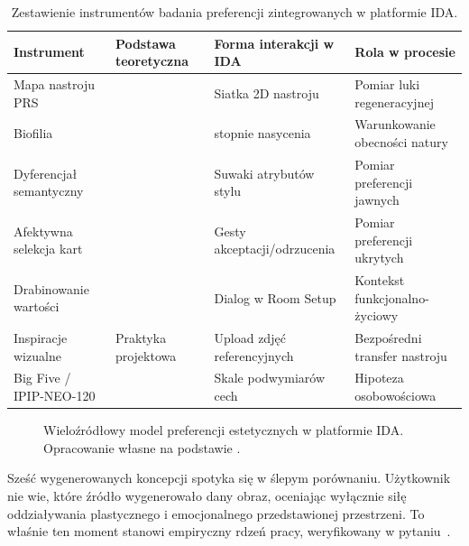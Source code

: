 \begin{table}[htbp]
  \centering
  \caption{Zestawienie instrumentów badania preferencji zintegrowanych w platformie IDA.}
  \label{tab:ch03:instruments}
  \begin{tabular}{@{}>{\raggedright\arraybackslash}p{}>{\raggedright\arraybackslash}p{}>{\raggedright\arraybackslash}p{}>{\raggedright\arraybackslash}p{}@{}}
    \toprule
    Instrument & Podstawa teoretyczna & Forma interakcji w IDA & Rola w procesie \\
    \midrule
    Mapa nastroju PRS
      & \textcite{hartig1997prs,kaplan1995restorative}
      & Siatka 2D nastroju
      & Pomiar luki regeneracyjnej \\
    Biofilia
      & \textcite{kellert2008biophilic}
      & 4 stopnie nasycenia
      & Warunkowanie obecności natury \\
    Dyferencjał semantyczny
      & \textcite{osgood1957measurement}
      & Suwaki atrybutów stylu
      & Pomiar preferencji jawnych \\
    Afektywna selekcja kart
      & \textcite{greenwald1998iat}
      & Gesty akceptacji/odrzucenia
      & Pomiar preferencji ukrytych \\
    Drabinowanie wartości
      & \textcite{reynolds1988laddering}
      & Dialog w Room Setup
      & Kontekst funkcjonalno-życiowy \\
    Inspiracje wizualne
      & Praktyka projektowa
      & Upload zdjęć referencyjnych
      & Bezpośredni transfer nastroju \\
    Big Five / IPIP-NEO-120
      & \textcite{john2008bigfive,gosling2002room}
      & Skale podwymiarów cech
      & Hipoteza osobowościowa \\
    \bottomrule
  \end{tabular}
\end{table}

\begin{figure}[htbp]
  \centering
  \caption[Wieloźródłowy model preferencji estetycznych w platformie IDA. Opracowanie własne na podstawie artefaktu.]{Wieloźródłowy model preferencji estetycznych w platformie IDA.
    Opracowanie własne na podstawie \cite{idaPlatform2026}.}
  \label{fig:ch03:multisource}
\end{figure}

Sześć wygenerowanych koncepcji spotyka się w ślepym porównaniu. Użytkownik nie wie, które źródło wygenerowało dany obraz, oceniając wyłącznie siłę oddziaływania plastycznego i emocjonalnego przedstawionej przestrzeni. To właśnie ten moment stanowi empiryczny rdzeń pracy, weryfikowany w pytaniu~.
